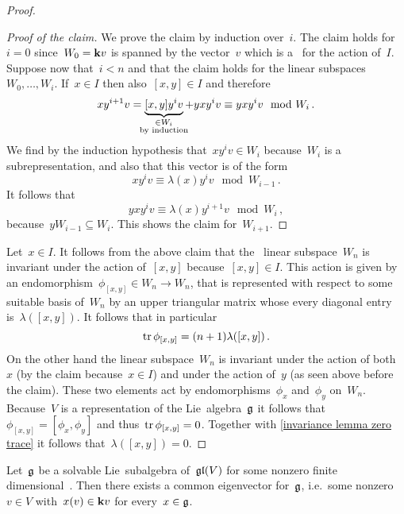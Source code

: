 \begin{proof}
 \begin{proof}[Proof of the claim]
    We prove the claim by induction over~$i$.
    The claim holds for~$i = 0$ since~$W_0 = \mathbf{k} v$ is spanned by the vector~$v$ which is a~{\weightvector{$\lambda$}} for the action of~$I$.
    Suppose now that~$i < n$ and that the claim holds for the linear subspaces~$W_0, \dotsc, W_i$.
    If~$x \in I$ then also~$[x,y] \in I$ and therefore
    \[
      x y^{i+1} v
      =
      \underbrace{[x,y] y^i v}_{\mathclap{\substack{\in W_i \\ \text{by induction}}}} + y x y^i v
      \equiv
      y x y^i v
      \mod
      W_i \,.
    \]
    We find by the induction hypothesis that~$x y^i v \in W_i$ because~$W_i$ is a subrepresentation, and also that this vector is of the form
    \[
      x y^i v
      \equiv
      \lambda(x) y^i v
      \mod
      W_{i-1} \,.
    \]
    It follows that
    \[
      y x y^i v
      \equiv
      \lambda(x) y^{i+1} v
      \mod W_i  \,,
    \]
    because~$y W_{i-1} \subseteq W_i$.
    This shows the claim for~$W_{i+1}$.
 \end{proof}
  
  Let~$x \in I$.
  It follows from the above claim that the~{} linear subspace~$W_n$ is invariant under the action of~$[x,y]$ because~$[x,y] \in I$.
  This action is given by an endomorphism~$\phi_{[x,y]} \in W_n \to W_n$, that is represented with respect to some suitable basis of~$W_n$ by an upper triangular matrix whose every diagonal entry is~$\lambda([x,y])$.
  It follows that in particular
  \begin{equation}
    \label{invariance lemma zero trace}
    \operatorname{tr} \phi_{[x,y]}
    =
    (n+1) \lambda([x,y])  \,.
  \end{equation}
  On the other hand the linear subspace~$W_n$ is invariant under the action of both~$x$ (by the claim because~$x \in I$) and under the action of~$y$ (as seen above before the claim).
  These two elements act by endomorphisms~$\phi_x$ and~$\phi_y$ on~$W_n$.
  Because~$V$ is a representation of the Lie~algebra~$\mathfrak{g}$ it follows that~$\phi_{[x,y]} = [\phi_x, \phi_y]$ and thus~$\operatorname{tr} \phi_{[x,y]} = 0$.
  Together with \eqref{invariance lemma zero trace} it follows that~$\lambda([x,y]) = 0$.
\end{proof}


\begin{theorem}[Lie]
  Let~$\mathfrak{g}$ be a solvable Lie~subalgebra of~$\mathfrak{gl}(V)$ for some nonzero finite dimensional~{\vectorspace{$\kf$}}. Then there exists a common eigenvector for~$\mathfrak{g}$, i.e.\ some nonzero~$v \in V$ with~$x(v) \in \mathbf{k} v$ for every~$x \in \mathfrak{g}$.
\end{theorem}


